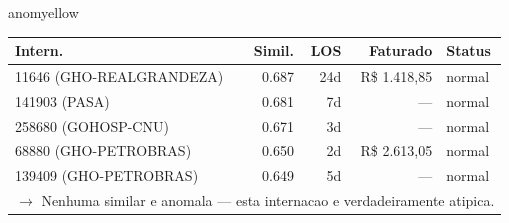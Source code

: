 \documentclass[a4paper,10pt]{article}
\begin{document}
\begin{anomalycard}[Internacao 118038 | GHO-BRADESCO | MODERADO (z=2.45)]{anomyellow}
\begin{tabular}{l r r r l}\toprule\textbf{Intern.} & \textbf{Simil.} & \textbf{LOS} & \textbf{Faturado} & \textbf{Status} \\\midrule
11646 (GHO-REALGRANDEZA) & 0.687 & 24d & R\$ 1.418,85 & \textcolor{jcubeblue}{normal} \\
141903 (PASA) & 0.681 & 7d & --- & \textcolor{jcubeblue}{normal} \\
258680 (GOHOSP-CNU) & 0.671 & 3d & --- & \textcolor{jcubeblue}{normal} \\
68880 (GHO-PETROBRAS) & 0.650 & 2d & R\$ 2.613,05 & \textcolor{jcubeblue}{normal} \\
139409 (GHO-PETROBRAS) & 0.649 & 5d & --- & \textcolor{jcubeblue}{normal} \\
\multicolumn{5}{l}{\textcolor{jcubeblue}{\small $\rightarrow$ Nenhuma similar e anomala --- esta internacao e verdadeiramente atipica.}} \\
\bottomrule\end{tabular}


\end{anomalycard}

\newpage
\end{document}
